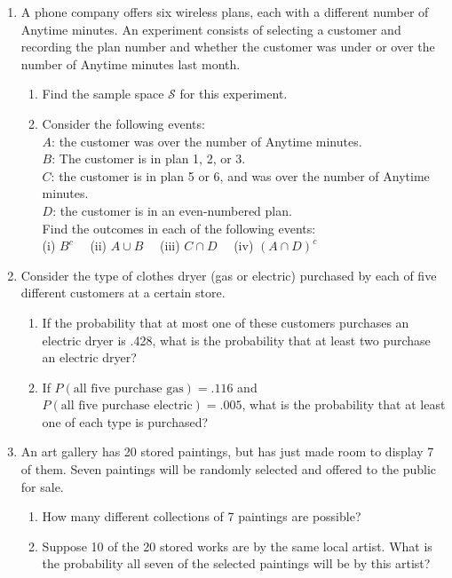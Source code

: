 \documentclass[12pt]{article}
\begin{document}
\begin{enumerate}
\item
A phone company offers six wireless plans, each with a different number
of Anytime minutes. An experiment consists of selecting a customer and
recording the plan number and whether the customer was under or over the
number of Anytime minutes last month.
\begin{enumerate}
\item Find the sample space $\mathcal{S}$ for this experiment.
\item Consider the following events:\\
$A$: the customer was over the number of Anytime minutes.\\
$B$: The customer is in plan 1, 2, or 3.\\
$C$: the customer is in plan 5 or 6, and was over the number of Anytime
minutes.\\
$D$: the customer is in an even-numbered plan.\\
Find the outcomes in each of the following events:\\
(i) $B^c$ \ \  (ii) $A \cup B$ \ \  
(iii) $C \cap D$ \ \  (iv) $(A \cap D)^c$
\end{enumerate}

\item
Consider the type of clothes dryer (gas or electric) purchased by each
of five different customers at a certain store.
\begin{enumerate}
\item If the probability that at most one of these customers
purchases an electric dryer is .428, what is the probability that at
least two purchase an electric dryer?
\item If $P(\text{all five purchase gas}) = .116$ and
$P(\text{all five purchase electric}) = .005$, what is the probability
that at least one of each type is purchased?
\end{enumerate}

\item
An art gallery has 20 stored paintings, but has just made room to
display 7 of them. Seven paintings will be randomly selected and offered
to the public for sale.
\begin{enumerate}
\item How many different collections of 7 paintings are possible?
\item Suppose 10 of the 20 stored works are by the same local artist. What is
the probability all seven of the selected paintings will be by this
artist?
\end{enumerate}



\end{enumerate}
\end{document}
